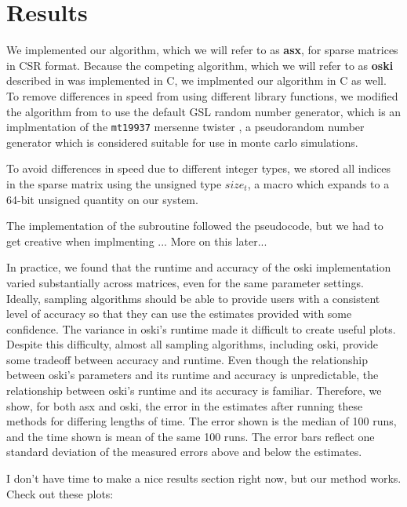 \section{Results}
  We implemented our algorithm, which we will refer to as \textbf{asx}, for sparse matrices in CSR format. Because the competing algorithm, which we will refer to as \textbf{oski} described in \cite{VuducDeYe05} was implemented in C, we implmented our algorithm in C as well. To remove differences in speed from using different library functions, we modified the algorithm from \cite{VuducDeYe05} to use the default GSL random number generator, which is an implmentation of the \texttt{mt19937} mersenne twister \cite{mt19937}, a pseudorandom number generator which is considered suitable for use in monte carlo simulations.

  To avoid differences in speed due to different integer types, we stored all indices in the sparse matrix using the unsigned type $size_t$, a macro which expands to a 64-bit unsigned quantity on our system.

  The implementation of the  subroutine followed the pseudocode, but we had to get creative when implmenting ... More on this later...

  In practice, we found that the runtime and accuracy of the oski implementation varied substantially across matrices, even for the same parameter settings. Ideally, sampling algorithms should be able to provide users with a consistent level of accuracy so that they can use the estimates provided with some confidence. The variance in oski's runtime made it difficult to create useful plots. Despite this difficulty, almost all sampling algorithms, including oski, provide some tradeoff between accuracy and runtime. Even though the relationship between oski's parameters and its runtime and accuracy is unpredictable, the relationship between oski's runtime and its accuracy is familiar. Therefore, we show, for both asx and oski, the error in the estimates after running these methods for differing lengths of time. The error shown is the median of 100 runs, and the time shown is mean of the same 100 runs. The error bars reflect one standard deviation of the measured errors above and below the estimates.

  I don't have time to make a nice results section right now, but our method works. Check out these plots:


